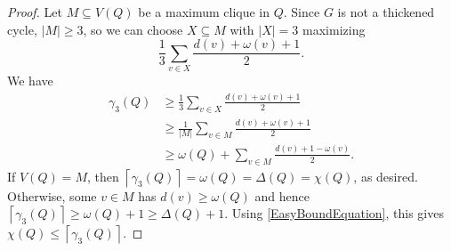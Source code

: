 \documentclass[12pt]{article}
\theoremstyle{plain}
\theoremstyle{definition}
\theoremstyle{remark}
\newcommand{\card}[1]{\left|#1\right|}
\newcommand{\ceil}[1]{\left\lceil#1\right\rceil}
\begin{document}
\begin{proof}
Let $M \subseteq V(Q)$ be a maximum clique in $Q$.  
Since $G$ is not a thickened cycle, $\card{M} \ge 3$, so we can choose $X
\subseteq M$ with $\card{X} = 3$ maximizing
\[\frac{1}{3}\sum_{v \in X} \frac{d(v) + \omega(v) + 1}{2}.\]
We have
\begin{align*}
\gamma_3(Q) &\ge \frac{1}{3}\sum_{v \in X} \frac{d(v) + \omega(v) + 1}{2}\\
&\ge \frac{1}{\card{M}}\sum_{v \in M} \frac{d(v) + \omega(v) + 1}{2}\\
&\ge \omega(Q) + \sum_{v \in M} \frac{d(v) + 1 - \omega(v)}{2}.
\end{align*}
If $V(Q) = M$, then $\ceil{\gamma_3(Q)} = \omega(Q) = \Delta(Q) = \chi(Q)$, as desired.
Otherwise, some $v \in M$ has $d(v) \ge \omega(Q)$ and hence $\ceil{\gamma_3(Q)} \ge \omega(Q) + 1 \ge \Delta(Q) + 1$.  Using 
\eqref{EasyBoundEquation}, this gives $\chi(Q) \le \ceil{\gamma_3(Q)}$.
\end{proof}
\end{document}
